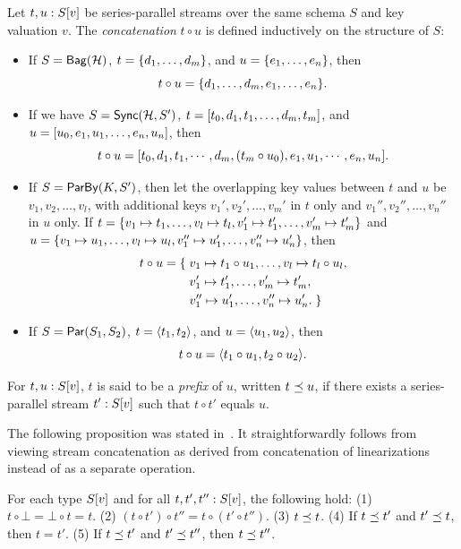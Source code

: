 \begin{definition}
\label{45:def:trace-concat}
Let $t, u: \spstype{v}{S}$ be series-parallel streams over the same schema $S$ and key valuation $v$.
The  \emph{concatenation} $t \circ u$ is defined inductively on the structure of $S$:
\begin{itemize}
\item If $S = \relleaf{\mathcal{H}}$,
$t = \spsbag{d_1, \ldots, d_m}$,
and $u = \spsbag{e_1, \ldots, e_n}$,
then
\[t \circ u = \spsbag{d_1, \ldots, d_m, e_1, \ldots, e_n}.\]
\item If we have $S = \hier{\mathcal{H}}{S'}$,
$t = \spsseq{t_0, d_1, t_1, \ldots, d_m, t_m}$,
and
$u = \spsseq{u_0, e_1, u_1, \ldots, e_n, u_n}$,
then
\[t \circ u =
\spsseq{t_0, d_1, t_1, \cdots, d_m, (t_m \circ u_0), e_1, u_1, \cdots, e_n, u_n}.
\]
\item If $S = \keyby{K}{S'}$,
then let the overlapping key values between $t$ and $u$ be
$v_1, v_2, \ldots, v_l$,
with additional keys $v_1', v_2', \ldots, v_m'$ in $t$ only
and $v_1'', v_2'', \ldots, v_n''$ in $u$ only.
If
$t = \spsbag{\keyed{v_1}{t_1}, \ldots, \keyed{v_l}{t_l},
\keyed{v_1'}{t_1'}, \ldots, \keyed{v_m'}{t_m'}}$
and
$u = \spsbag{\keyed{v_1}{u_1}, \ldots, \keyed{v_l}{u_l},
\keyed{v_1''}{u_1'}, \ldots, \keyed{v_n''}{u_n'}}$,
then
\begin{align*}
t \circ u = \spsbagleft{}
&\keyed{v_1}{t_1 \circ u_1}, \ldots, \keyed{v_l}{t_l \circ u_l}, \\
&\keyed{v_1'}{t_1'}, \ldots, \keyed{v_m'}{t_m'}, \\
&\keyed{v_1''}{u_1'}, \ldots, \keyed{v_n''}{u_n'}.\spsbagright{}
\end{align*}
\item If $S = \parcomp{S_1}{S_2}$,
$t = \spspar{t_1}{t_2}$, and $u = \spspar{u_1}{u_2}$,
then
\[
t \circ u = \spspar{t_1 \circ u_1}{t_2 \circ u_2}.
\]
\end{itemize}
For $t, u: \spstype{v}{S}$, $t$ is said to be a {\em prefix} of $u$, written $t\prefix u$,
if there exists a series-parallel stream $t' : \spstype{v}{S}$ such that $t\circ t'$
equals $u$.
\end{definition}

The following proposition was stated in~.
It straightforwardly follows from viewing stream concatenation as derived from concatenation of linearizations instead of as a separate operation.

\begin{proposition}
\label{45:prop:sps-concat-properties}
For each type $\spstype{v}{S}$ and for all $t, t', t'': \spstype{v}{S}$,
the following hold:
(1) $t \circ \bot = \bot \circ t = t$.
(2) $(t \circ t') \circ t'' = t \circ (t' \circ t'')$.
(3) $t \prefix t$.
(4) If $t \prefix t'$ and $t' \prefix t$, then $t = t'$.
(5) If $t \prefix t'$ and $t' \prefix t''$, then $t \prefix t''$.
\end{proposition}

